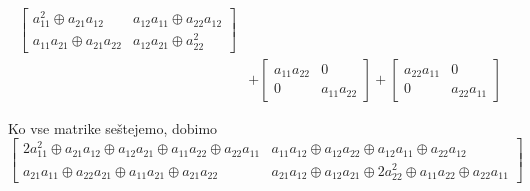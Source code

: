 \documentclass[mat1]{fmfdelo}
\begin{document}
\begin{zgled}
\begin{align*}
\begin{bmatrix}
a_{11}^2 \oplus a_{21}a_{12} & a_{12}a_{11} \oplus a_{22}a_{12} \\
a_{11}a_{21} \oplus a_{21}a_{22} & a_{12}a_{21} \oplus a_{22}^2
\end{bmatrix} \\ &+ \begin{bmatrix}
	a_{11}a_{22} & 0 \\
	0 & a_{11}a_{22}
\end{bmatrix} + \begin{bmatrix}
	a_{22}a_{11} & 0 \\
	0 & a_{22}a_{11}
\end{bmatrix}\end{align*}

Ko vse matrike seštejemo, dobimo
$$\begin{bmatrix}
	2a_{11}^2 \oplus a_{21}a_{12} \oplus a_{12}a_{21} \oplus a_{11}a_{22} \oplus a_{22}a_{11} & a_{11}a_{12} \oplus a_{12}a_{22} \oplus a_{12}a_{11} \oplus a_{22}a_{12} \\ a_{21}a_{11} \oplus a_{22}a_{21} \oplus a_{11}a_{21} \oplus a_{21}a_{22} & a_{21}a_{12} \oplus a_{12}a_{21} \oplus 2a_{22}^2 \oplus a_{11}a_{22} \oplus a_{22}a_{11}
\end{bmatrix}$$


\end{zgled}
\end{document}
